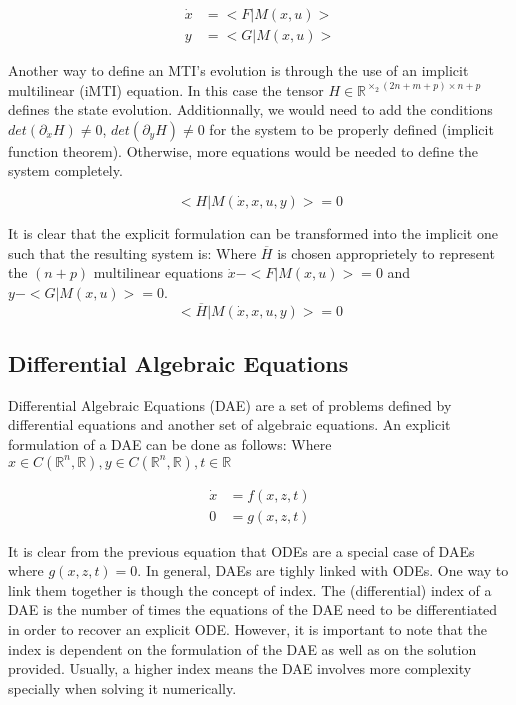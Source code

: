 \documentclass{article}
\begin{document}
\begin{align}
    \dot{x} &= <F|M(x,u)>\\
    y &= <G|M(x,u)>
\end{align}

Another way to define an MTI's evolution is through the use of an implicit multilinear (iMTI) equation.
In this case the tensor $H \in \mathbb{R}^{\times_2 (2n+m+p) \times n+p}$ defines the state evolution. 
Additionnally, we would need to add the conditions $det(\partial_{\dot{x}} H) \neq 0$, $det(\partial_y H) \neq 0$ 
for the system to be properly defined (implicit function theorem). Otherwise, more equations would be needed to 
define the system completely.

\begin{equation}
    <H| M(\dot{x}, x, u, y)> = 0
\end{equation}

It is clear that the explicit formulation can be transformed into the implicit one such that the resulting system is:
Where $\overline{H}$ is chosen approprietely to represent the $(n+p)$ multilinear equations $\dot{x} - <F|M(x,u)> = 0$
and $y - <G|M(x,u)> = 0$.
\begin{equation}
    <\overline{H}| M(\dot{x}, x, u, y)> = 0
\end{equation}

\subsection{Differential Algebraic Equations}

Differential Algebraic Equations (DAE) are a set of problems defined by differential equations
and another set of algebraic equations. An explicit formulation of a DAE can be done as follows:
Where $x \in C(\mathbb{R}^n, \mathbb{R}), y \in C(\mathbb{R}^n, \mathbb{R}), t \in \mathbb{R}$

\begin{align}\label{DAE:explicit}
    \dot{x} &= f(x, z, t) \\
    0 &= g(x, z, t)
\end{align}

It is clear from the previous equation that ODEs are a special case of DAEs where $g(x,z,t) = 0$.
In general, DAEs are tighly linked with ODEs. One way to link them together is though the concept of index.
The (differential) index of a DAE is the number of times the equations  of the DAE
need to be differentiated in order to recover an explicit ODE. 
However, it is important to note that the index is dependent on the formulation of the DAE
as well as on the solution provided. Usually, a higher index means the DAE involves more complexity
specially when solving it numerically. \\
\end{document}
